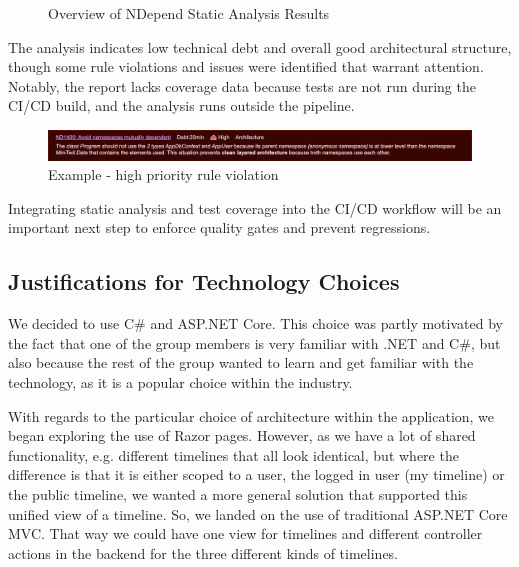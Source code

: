 \documentclass[12pt,a4paper,reqno]{report}
\begin{document}
\begin{figure}[h!]
\begin{minipage}[b]{0.53\textwidth}
    \end{minipage}
    \caption{Overview of NDepend Static Analysis Results }
    \label{fig:composite}
\end{figure}

The analysis indicates low technical debt and overall good architectural structure, though some rule violations and issues were identified that warrant attention. Notably, the report lacks coverage data because tests are not run during the CI/CD build, and the analysis runs outside the pipeline.

\begin{figure}[h!]
    \centering
    \includegraphics[width=\textwidth]{images/high-priority-rule-violation.png}
    \caption{Example - high priority rule violation}
    \label{fig:minitwit-diagram}
\end{figure}

Integrating static analysis and test coverage into the CI/CD workflow will be an important next step to enforce quality gates and prevent regressions.

\subsection{Justifications for Technology Choices}

We decided to use C\# and ASP.NET Core. This choice was partly motivated by the fact that one of the group members is very familiar with .NET and C\#, but also because the rest of the group wanted to learn and get familiar with the technology, as it is a popular choice within the industry.

With regards to the particular choice of architecture within the application, we began exploring the use of Razor pages. However, as we have a lot of shared functionality, e.g. different timelines that all look identical, but where the difference is that it is either scoped to a user, the logged in user (my timeline) or the public timeline, we wanted a more general solution that supported this unified view of a timeline. So, we landed on the use of traditional ASP.NET Core MVC. That way we could have one view for timelines and different controller actions in the backend for the three different kinds of timelines.
\end{document}
